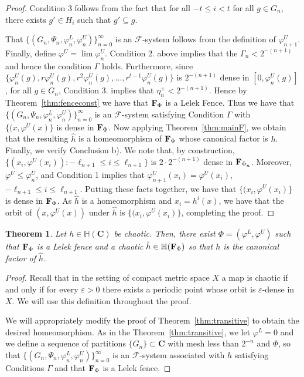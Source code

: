 \documentclass[11pt]{amsart}
\newtheorem{theorem}{Theorem}[section]
\newcommand{\eps}{\varepsilon} %
\newcommand{\cantor}{\mathbf C}
\newcommand{\fence}{{\bf F}_{\Phi}{}}
\newcommand{\nfence}{{\bf F}_{\Phi_n}{}}
\newcommand{\groupcantor}{{\mathbb H}(\cantor)}
\newcommand{\groupfence}{{\mathbb{H}(\fence)}}
\newcommand{\cF}{\mathcal{F}}
\newcommand{\fsystem}{\{(G_n, \Psi_n,\varphi^L_n,\varphi^U_n)\}_{n=0}^{\infty}}
\begin{document}
{\begin{proof}
Condition 3 follows from the fact that  for all $-t \le i < t$ for all $ g \in G_n$, there exists $g' \in H_i$ such that $g' \subseteq g$.

That $\fsystem$ is an $\cF$-system follows from the definition of $\varphi^U_{n+1}$. Finally, define $\varphi^U = \lim \varphi^U_n$. Condition 2. above implies that the $\Gamma_n < 2^{-(n+1)}$ and hence the condition $\Gamma$ holds. Furthermore, since  $\{\varphi^U_n(g), r\varphi^U_n(g), r^2 \varphi^U_n(g), \ldots, r^{t-1} \varphi^U_n(g)\}$ is $2^{-(n+1)}$ dense in $[0, \varphi^U_n(g)]$, for all $g \in G_n$, Condition 3. implies that $\eta^+_n < 2^{-(n+1)}$. Hence by Theorem~\ref{thm:fenceconst} we have that $\fence$ is a Lelek Fence. Thus we have that $\fsystem$ is an $\cF$-system satisfying Condition $\Gamma$ with $\{(x, \varphi^U(x)\}$ is dense in $\fence$. Now applying Theorem~\ref{thm:mainF}, we obtain that the resulting $\hat{h}$ is a homeomorphism of $\fence$ whose canonical factor is $h$.  Finally, we verify Conclusion b). We note that, by construction, $  \{ (x_i, \varphi^U(x_i)): - \ell_{n+1} \le  i \le \ell_{n+1}\}$ is $2\cdot 2^{-(n+1)}$ dense in $\nfence$. Moreover, $\varphi^U \le \varphi^U_n$, and  Condition 1 implies that $\varphi^U_{n+1}(x_i) = \varphi^U(x_i)$, $- \ell_{n+1} \le  i \le \ell_{n+1}$. Putting these facts together, we have that $\{(x_i, \varphi^U (x_i) \}$ is dense in $\fence$. As $\hat{h}$ is a homeomorphism and  $x_i =h ^i(x)$, we have that the orbit  of $(x, \varphi^U (x))$ under $\hat {h}$ is $\{(x_i, \varphi^U (x_i) \}$, completing the proof. 


\end{proof}
 \begin{theorem}\label{thm:chaotic}
        Let $h \in \groupcantor$ be chaotic. Then, there exist $\Phi = (\varphi^L, \varphi^U)$ such that $\fence$ is a Lelek fence and a chaotic $\hat{h} \in \groupfence$ so that $h$ is the canonical factor of $\hat{h}$.
    \end{theorem}
    \begin{proof}
    Recall that in the setting of compact metric space $X$ a map is chaotic if and only if for every $\eps>0$ there exists a periodic point whose orbit is $\eps$-dense in $X$. We will use this definition throughout the proof.
        
        
        We will appropriately modify the proof of Theorem~\ref{thm:transitive} to obtain the desired homeomorphism.
        As in the Theorem~\ref{thm:transitive}, we let $\varphi^L=0$ and we define a sequence of partitions $\{G_n\}\subset \cantor$ with mesh less than $2^{-n}$ and $\Phi$, so that $\fsystem$ is an  $\cF$-system associated with $h$ satisfying Conditions $\Gamma$ and that $\fence$ is a Lelek fence. 


\end{proof}}
\end{document}
